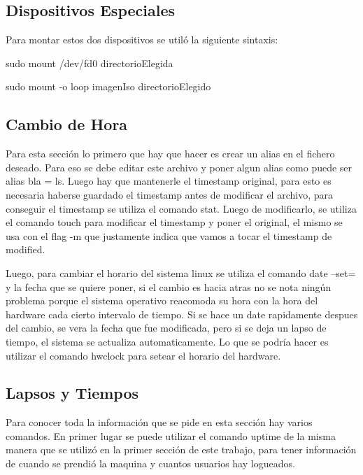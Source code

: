 \documentclass[a4paper, 12pt]{article}
\begin{document}
\subsection*{Dispositivos Especiales}

Para montar estos dos dispositivos se util\'o la siguiente sintaxis:

sudo mount /dev/fd0 directorioElegida

sudo mount -o loop imagenIso directorioElegido



\subsection*{Cambio de Hora}

Para esta secci\'on lo primero que hay que hacer es crear un alias en el fichero deseado. Para eso se debe editar este archivo y poner algun alias como puede ser alias bla = ls. Luego hay que mantenerle el timestamp original, para esto es necesaria haberse guardado el timestamp antes de modificar el archivo, para conseguir el timestamp se utiliza el comando stat. Luego de modificarlo, se utiliza el comando touch para modificar el timestamp y poner el original, el mismo se usa con el flag -m que justamente indica que vamos a tocar el timestamp de modified. 

Luego, para cambiar el horario del sistema linux se utiliza el comando date --set= y la fecha que se quiere poner, si el cambio es hacia atras no se nota ning\'un problema porque el sistema operativo reacomoda su hora con la hora del hardware cada cierto intervalo de tiempo. Si se hace un date rapidamente despues del cambio, se vera la fecha que fue modificada, pero si se deja un lapso de tiempo, el sistema se actualiza automaticamente. Lo que se podr\'ia hacer es utilizar el comando hwclock para setear el horario del hardware.

\subsection*{Lapsos y Tiempos}

Para conocer toda la informaci\'on que se pide en esta secci\'on hay varios comandos. En primer lugar se puede utilizar el comando uptime de la misma manera que se utiliz\'o en la primer secci\'on de este trabajo, para tener informaci\'on de cuando se prendi\'o la maquina y cuantos usuarios hay logueados. 
\end{document}
